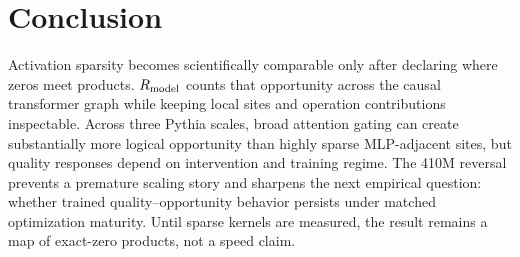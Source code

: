 \section{Conclusion}

Activation sparsity becomes scientifically comparable only after declaring
where zeros meet products.  $R_{\mathrm{model}}$ counts that opportunity across the causal
transformer graph while keeping local sites and operation contributions
inspectable.  Across three Pythia scales, broad attention gating can create
substantially more logical opportunity than highly sparse MLP-adjacent sites,
but quality responses depend on intervention and training regime.  The 410M
reversal prevents a premature scaling story and sharpens the next empirical
question: whether trained quality--opportunity behavior persists under matched
optimization maturity.  Until sparse kernels are measured, the result remains
a map of exact-zero products, not a speed claim.

